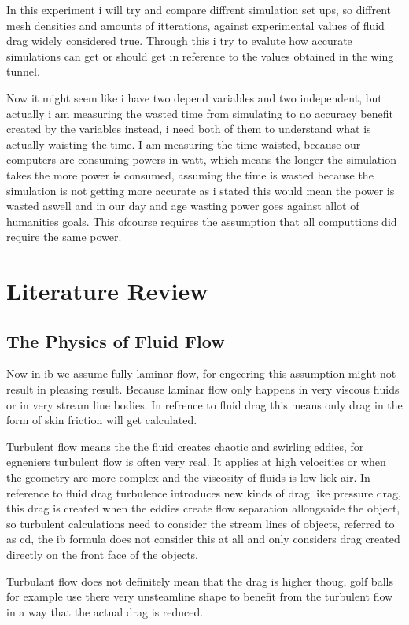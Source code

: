 \documentclass[12pt,a4paper]{article}
\begin{document}
In this experiment i will try and compare diffrent simulation set ups, so diffrent mesh densities and amounts of itterations, against experimental values of fluid drag widely considered true. Through this i try to evalute how accurate simulations can get or should get in reference to the values obtained in the wing tunnel.

Now it might seem like i have two depend variables and two independent, but actually i am measuring the wasted time from simulating to no accuracy benefit created by the variables instead, i need both of them to understand what is actually waisting the time. I am measuring the time waisted, because our computers are consuming powers in watt, which means the longer the simulation takes the more power is consumed, assuming the time is wasted because the simulation is not getting more accurate as i stated this would mean the power is wasted aswell and in our day and age wasting power goes against allot of humanities goals. This ofcourse requires the assumption that all computtions did require the same power.

\section{Literature Review}

\subsection{The Physics of Fluid Flow}

Now in ib we assume fully laminar flow, for engeering this assumption might not result in pleasing result. Because laminar flow only happens in very viscous fluids or in very stream line bodies. In refrence to fluid drag this means only drag in the form of skin friction will get calculated.

Turbulent flow means the the fluid creates chaotic and swirling eddies, for egneniers turbulent flow is often very real. It applies at high velocities or when the geometry are more complex and the viscosity of fluids is low liek air. In reference to fluid drag turbulence introduces new kinds of drag like pressure drag, this drag is created when the eddies create flow separation allongsaide the object, so turbulent calculations need to consider the stream lines of objects, referred to as cd, the ib formula does not consider this at all and only considers drag created directly on the front face of the objects. 

Turbulant flow does not definitely mean that the drag is higher thoug, golf balls for example use there very unsteamline shape to benefit from the turbulent flow in a way that the actual drag is reduced.
\end{document}
